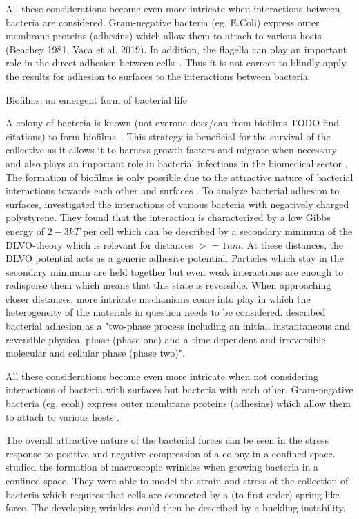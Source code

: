 \documentclass{article}
\begin{document}
All these considerations become even more intricate when interactions between bacteria are considered.
Gram-negative bacteria (eg. E.Coli) express outer membrane proteins (adhesins) which allow them to
attach to various hosts (Beachey 1981, Vaca et al. 2019).
In addition, the flagella can play an important role in the direct adhesion between
cells~\cite{Haiko2013}.
Thus it is not correct to blindly apply the results for adhesion to surfaces to the interactions
between bacteria.

Biofilms: an emergent form of bacterial life \cite{Flemming2016}

A colony of bacteria is known (not everone does/can from biofilms TODO find citations) to form biofilms~\cite{Dunne2002}.
This strategy is beneficial for the survival of the collective as it allows it to harness growth factors and migrate when necessary and also plays an important role in bacterial infections in the biomedical sector \cite{Ong1999}.
The formation of biofilms is only possible due to the attractive nature of bacterial interactions towards each other and surfaces \cite{Berne2018}.
To analyze bacterial adhesion to surfaces, \cite{vanLoosdrecht1989} investigated the interactions of various bacteria with negatively charged polystyrene.
They found that the interaction is characterized by a low Gibbs energy of $2-3kT$ per cell which can be described by a secondary minimum of the DLVO-theory \cite{Derjaguin1993,Verwey1947} which is relevant for distances $>=1nm$.
At these distances, the DLVO potential acts as a generic adhesive potential.
Particles which stay in the secondary minimum are held together but even weak interactions are enough to redisperse them which means that this state is reversible.
When approaching closer distances, more intricate mechanisms come into play in which the heterogeneity of the materials in question needs to be considered.
\cite{Hori2010} described bacterial adhesion as a "two-phase process including an initial, instantaneous and reversible physical phase (phase one) and a time-dependent and irreversible molecular and cellular phase (phase two)".

All these considerations become even more intricate when not considering interactions of bacteria with surfaces but bacteria with each other. Gram-negative bacteria (eg. \ac{ecoli}) express outer membrane proteins (adhesins) which allow them to attach to various hosts \cite{Vaca2019,Beachey1981}.


The overall attractive nature of the bacterial forces can be seen in the stress response to positive and negative compression of a colony in a confined space.
\cite{Trejo2013} studied the formation of macroscopic wrinkles when growing bacteria in a confined space.
They were able to model the strain and stress of the collection of bacteria which requires that cells are connected by a (to first order) spring-like force.
The developing wrinkles could then be described by a buckling instability.
\end{document}
